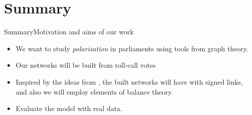 \section{Summary}
\begin{frame}[t]{Summary}{Motivation and aims of our work}
	{\centering
	}
	\begin{itemize}[<+->]
	\item We want to study \emph{polarization} in parliaments using tools from graph theory.
	\item Our networks will be built from roll-call votes 
	\item Inspired by the ideas from \citet{Neal2020}, the built networks will have with signed links, and also we will employ elements of balance theory.
	\item<+-> Evaluate the model with real data.
\end{itemize}
\end{frame}


